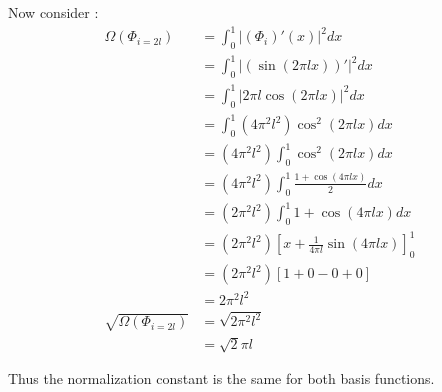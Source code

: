 \documentclass{./tufte-handout}
\begin{document}
\begin{enumerate}[(a)]
\begin{enumerate}
    Now consider : 
    \begin{align}
        \Omega(\Phi_{i=2l}) &= \int_0^1 |(\Phi_i)'(x)|^2 dx \\
            &= \int_0^1 | (\sin(2 \pi l x ))' |^2 dx \\
            &= \int_0^1 | 2 \pi l \cos(2 \pi l x) |^2 dx \\
            &= \int_0^1 (4 \pi^2 l^2) \cos^2(2 \pi l x) dx \\
            &= (4 \pi^2 l^2) \int_0^1  \cos^2(2 \pi l x) dx \\
            &= (4 \pi^2 l^2) \int_0^1  \frac{1 + \cos(4 \pi l x)}{2} dx \\
            &= (2 \pi^2 l^2) \int_0^1  1 + \cos(4 \pi l x) dx \\
            &= (2 \pi^2 l^2) \left[ x + \frac{1}{4 \pi l} \sin(4 \pi l x) \right]_0^1 \\
            &= (2 \pi^2 l^2) \left[ 1 + 0 - 0 + 0 \right] \\
            &= 2 \pi^2 l^2\\
        \sqrt{\Omega(\Phi_{i=2l})} &= \sqrt{2 \pi^2 l^2} \\
            &= \sqrt{2} \pi l
    \end{align} 

    Thus the normalization constant is the same for both basis functions.


\end{enumerate}
\end{enumerate}
\end{document}
